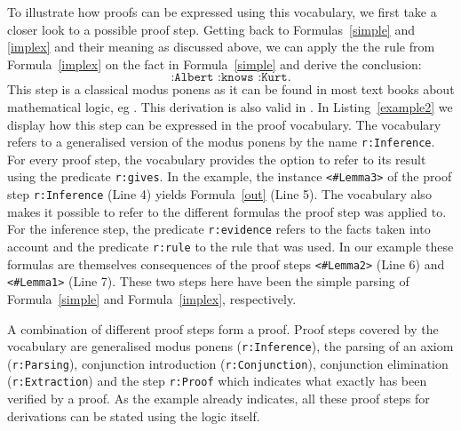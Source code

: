 To illustrate how proofs can be expressed using this vocabulary, we first take a closer look to a possible proof step. Getting back to Formulas~\ref{simple} and \ref{implex} and 
their meaning as discussed above, 
 we can apply the the rule from Formula~\ref{implex} on the fact in Formula~\ref{simple} and derive the conclusion:
\begin{equation}
\texttt{:Albert :knows :Kurt.}\label{out}
\end{equation}
This step is a classical modus ponens as it can be found in most text books about mathematical logic, eg \cite{enderton,mendelson,ebbinghaus}.
This derivation is also valid in \nthree. 
In Listing~\ref{example2} we display how this step can be expressed in the proof vocabulary. The vocabulary refers to a generalised version of the modus ponens by the 
name \texttt{r:Inference}. 
For every proof step, the vocabulary provides the option to refer to its result using the predicate \texttt{r:gives}.
In the example, the instance \texttt{<\#Lemma3>} of the proof  step \texttt{r:Inference} (Line 4) yields Formula~\ref{out} (Line 5). The vocabulary also makes it possible to 
refer to the different formulas the proof step was applied to. For the inference step, the predicate \texttt{r:evidence} refers to the facts taken into account and the 
predicate \texttt{r:rule} to the rule that was used. In our example these formulas are themselves consequences of the proof steps \texttt{<\#Lemma2>} (Line 6)
and \texttt{<\#Lemma1>} (Line 7). 
These two steps here have been the simple parsing of Formula~\ref{simple} and Formula~\ref{implex}, respectively. 

A combination of different  proof steps form a proof. Proof steps covered by the vocabulary are generalised modus ponens (\texttt{r:Inference}), the parsing of an axiom 
(\texttt{r:Parsing}), conjunction introduction (\texttt{r:Conjunction}), conjunction elimination (\texttt{r:Extraction}) and the step \texttt{r:Proof} which indicates what exactly 
has been verified by a proof. As the example already indicates, all these proof steps for \nthree derivations can be stated using the logic itself. 

